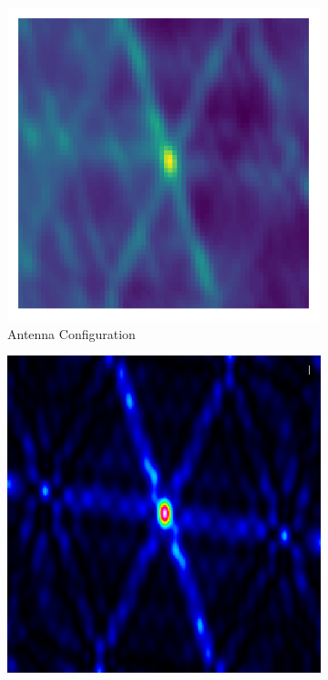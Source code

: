 \begin{figure}[h!]
	\centering
	\begin{subfigure}[b]{0.3\linewidth}
		 \includegraphics[width=\linewidth, trim={16px 16px 16px 16px}, clip]{./chapters/01.intro/img/mytest.png}
		 \caption{Antenna Configuration}
	\end{subfigure}
	\begin{subfigure}[b]{0.3\linewidth}
		\includegraphics[width=\linewidth]{./chapters/01.intro/img/PSF.png}

\end{subfigure}
\end{figure}
